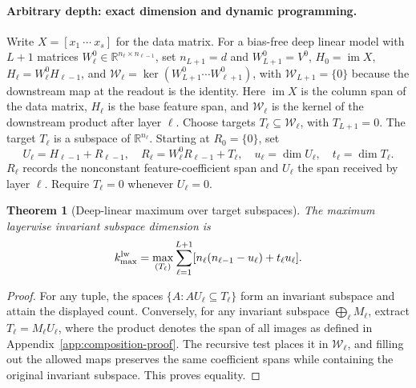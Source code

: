 \documentclass[twoside]{article}
\newtheorem{theorem}{Theorem}
\theoremstyle{remark}
\newcommand{\R}{\mathbb R}
\theoremstyle{highlightdefinition}
\theoremstyle{remark}
\begin{document}
\paragraph{Arbitrary depth: exact dimension and dynamic programming.}
Write $X=[x_1\ \cdots\ x_s]$ for the data matrix. For a bias-free deep linear model with $L+1$ matrices $W_\ell^0\in\R^{n_\ell\times n_{\ell-1}}$, set $n_{L+1}=d$ and $W_{L+1}^0=V^0$, $H_0=\operatorname{im}X$, $H_\ell=W_\ell^0H_{\ell-1}$, and $\mathcal W_\ell=\ker(W_{L+1}^0\cdots W_{\ell+1}^0)$, with $\mathcal W_{L+1}=\{0\}$ because the downstream map at the readout is the identity. Here $\operatorname{im}X$ is the column span of the data matrix, $H_\ell$ is the base feature span, and $\mathcal W_\ell$ is the kernel of the downstream product after layer $\ell$. Choose targets $T_\ell\subseteq\mathcal W_\ell$, with $T_{L+1}=0$. The target $T_\ell$ is a subspace of $\R^{n_\ell}$. Starting at $R_0=\{0\}$, set
\[
 U_\ell=H_{\ell-1}+R_{\ell-1},\quad
 R_\ell=W_\ell^0R_{\ell-1}+T_\ell,\quad
 u_\ell=\dim U_\ell,\quad t_\ell=\dim T_\ell.
\]
$R_\ell$ records the nonconstant feature-coefficient span and $U_\ell$ the span received by layer $\ell$. Require $T_\ell=0$ whenever $U_\ell=0$. 
\begin{theorem}[Deep-linear maximum over target subspaces]
The maximum layerwise invariant subspace dimension is
\[
 k_{\max}^{\rm lw}=\max_{(T_\ell)}\sum_{\ell=1}^{L+1}
       [n_\ell(n_{\ell-1}-u_\ell)+t_\ell u_\ell].
\]
\end{theorem}
\begin{proof}
For any tuple, the spaces $\{A:AU_\ell\subseteq T_\ell\}$ form an invariant subspace and attain the displayed count. Conversely, for any invariant subspace $\bigoplus_\ell M_\ell$, extract $T_\ell=M_\ell U_\ell$, where the product denotes the span of all images as defined in Appendix~\ref{app:composition-proof}. The recursive test places it in $\mathcal W_\ell$, and filling out the allowed maps preserves the same coefficient spans while containing the original invariant subspace. This proves equality.
\end{proof}
\end{document}
